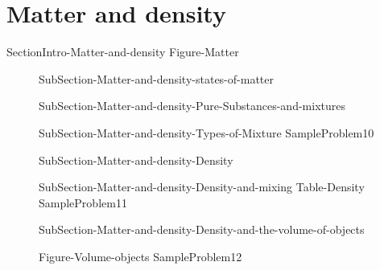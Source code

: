 \documentclass[main.tex]{subfiles}
\newcommand\chapterlabel{Ch-measurements}\setcounter{figurenewcounter}{0}\setcounter{tablenewcounter}{0}\setcounter{formulanewcounter}{0}
\begin{document}
\section{Matter and density}
{SectionIntro-Matter-and-density}
{Figure-Matter}		
\sloppy\begin{description}
\item[] {SubSection-Matter-and-density-states-of-matter}
\item[]{SubSection-Matter-and-density-Pure-Substances-and-mixtures}
\item[]{SubSection-Matter-and-density-Types-of-Mixture}
{SampleProblem10}
\item[]{SubSection-Matter-and-density-Density}
\item[]{SubSection-Matter-and-density-Density-and-mixing}
{Table-Density} 
{SampleProblem11}
\item[]{SubSection-Matter-and-density-Density-and-the-volume-of-objects}

{Figure-Volume-objects}
{SampleProblem12}
\end{description}
\clearpage\thispagestyle{empty}\mbox{}\clearpage
\end{document}
